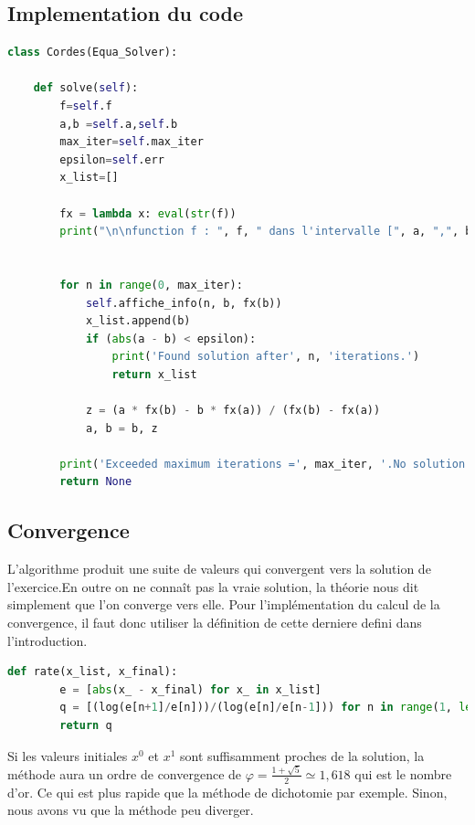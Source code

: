 \documentclass{article}
\begin{document}
\subsection{Implementation du code}
\begin{lstlisting}[language=Python, caption=Méthode des cordes en Python]
    class Cordes(Equa_Solver):
    
    def solve(self):
        f=self.f
        a,b =self.a,self.b
        max_iter=self.max_iter
        epsilon=self.err
        x_list=[]

        fx = lambda x: eval(str(f))
        print("\n\nfunction f : ", f, " dans l'intervalle [", a, ",", b, "] \n", "--------------------------------")


        for n in range(0, max_iter):
            self.affiche_info(n, b, fx(b))
            x_list.append(b)
            if (abs(a - b) < epsilon):
                print('Found solution after', n, 'iterations.')
                return x_list

            z = (a * fx(b) - b * fx(a)) / (fx(b) - fx(a))
            a, b = b, z

        print('Exceeded maximum iterations =', max_iter, '.No solution found.')
        return None
\end{lstlisting}

\subsection{Convergence}
L'algorithme produit une suite de valeurs qui convergent vers la solution de l'exercice.En outre on ne connaît pas la vraie solution, la théorie nous dit simplement que l'on converge vers elle.
Pour l'implémentation du calcul de la convergence, il faut donc utiliser la définition de cette derniere defini dans l'introduction. 
\begin{lstlisting}[language=Python, caption=Calcul de convergence en Python]
    def rate(x_list, x_final):
        e = [abs(x_ - x_final) for x_ in x_list]
        q = [(log(e[n+1]/e[n]))/(log(e[n]/e[n-1])) for n in range(1, len(e)-1, 1)]
        return q
\end{lstlisting}

Si les valeurs initiales $x^0$ et $x^1$ sont suffisamment proches de la solution, la méthode aura un ordre de convergence de
${\displaystyle \varphi ={\frac {1+{\sqrt {5}}}{2}}\simeq 1,618} $ qui est le nombre d'or.
Ce qui est plus rapide que la méthode de dichotomie par exemple.
Sinon, nous avons vu que la méthode peu diverger.
\end{document}
